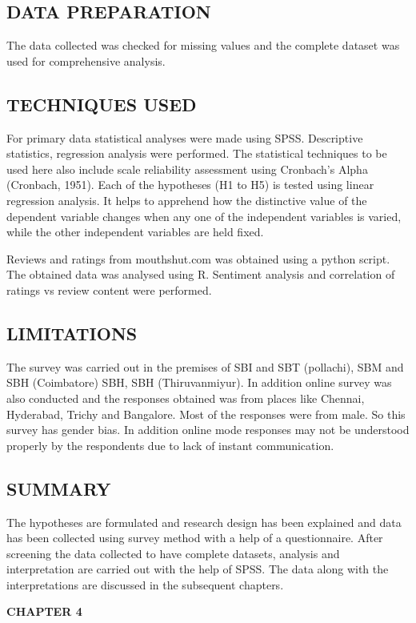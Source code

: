 \documentclass[a4paper, 12pt]{extarticle}
\begin{document}
{\subsection{DATA PREPARATION}
The data collected was checked for missing values and the complete dataset was used for comprehensive analysis.

\subsection{TECHNIQUES USED}
For primary data statistical analyses were made using SPSS. Descriptive statistics, regression analysis were performed. The statistical techniques to be used here also include scale reliability assessment using Cronbach's Alpha (Cronbach, 1951). Each of the hypotheses (H1 to H5) is tested using linear regression analysis. It helps to apprehend how the distinctive value of the dependent variable changes when any one of the independent variables is varied, while the other independent variables are held fixed.

Reviews and ratings from mouthshut.com was obtained using a python script. The obtained data was analysed using R. Sentiment analysis and correlation of ratings vs review content were performed.
 

\subsection{LIMITATIONS}
The survey was carried out in the premises of SBI and SBT (pollachi), SBM and SBH (Coimbatore) SBH, SBH (Thiruvanmiyur). In addition online survey was also conducted and the responses obtained was from places like Chennai, Hyderabad, Trichy and Bangalore. Most of the responses were from male. So this survey has gender bias. In addition online mode responses may not be understood properly by the respondents due to lack of instant communication. 

\subsection{SUMMARY}
The hypotheses are formulated and research design has been explained and data has been collected using survey method with a help of a questionnaire. After screening the data collected to have complete datasets, analysis and interpretation are carried out with the help of SPSS. The data along with the interpretations are discussed in the subsequent chapters.

\newpage
\begin{center}
\textbf{\large CHAPTER 4}
\end{center}
}
\end{document}
